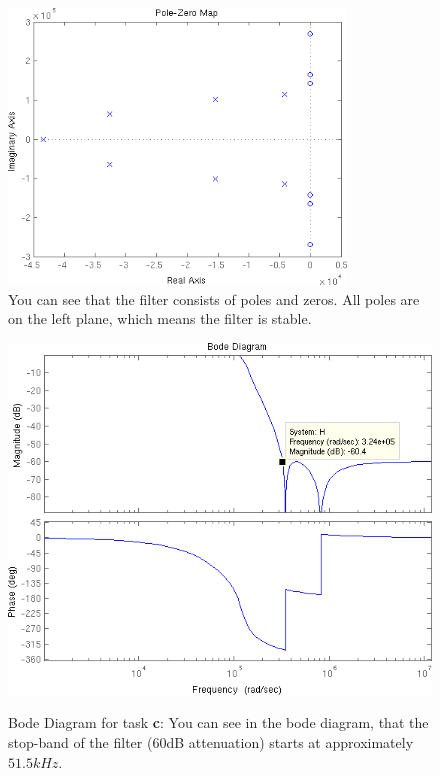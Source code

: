 \begin{figure}[h!]
 \centering
 \includegraphics[width=0.8\textwidth]{./pics/2_a_pzmap.png}
 \caption{You can see that the filter consists of poles and zeros. All poles are on the left plane, which
 means the filter is stable.}
 \label{fig:2_a_pzmap}
\end{figure}

\begin{figure}[h!]
 \centering
 \includegraphics[width=\textwidth]{./pics/2_c_bode.png}
 \label{fig:2_c_bode}
 \caption{Bode Diagram for task \textbf{c}: You can see in the bode diagram, that the stop-band of the filter (60dB attenuation)
 starts at approximately $51.5 kHz$.}
\end{figure}



